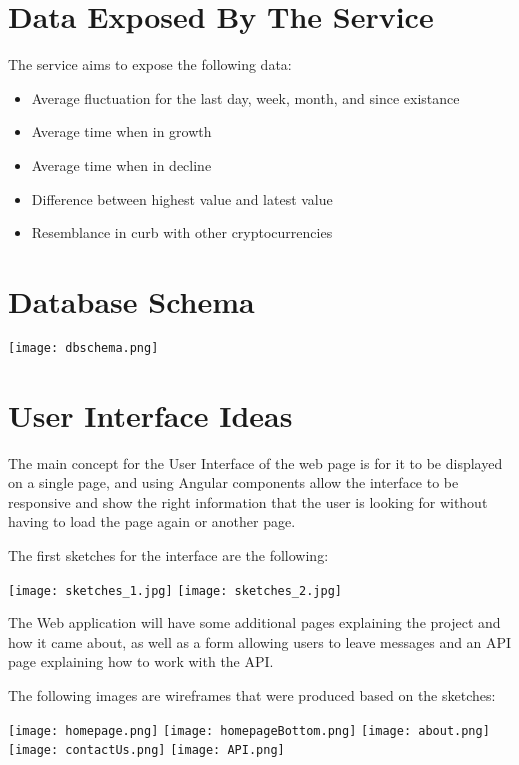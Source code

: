 \section{Data Exposed By The Service}
The service aims to expose the following data:
\begin{itemize}
    \item Average fluctuation for the last day, week, month, and since existance
    \item Average time when in growth
    \item Average time when in decline
    \item Difference between highest value and latest value
    \item Resemblance in curb with other cryptocurrencies
\end{itemize}
\section{Database Schema}
\begin{center}
    \texttt{[image: dbschema.png]}
\end{center}


\section{User Interface Ideas}
The main concept for the User Interface of the web page is for it to be displayed on a single page, and using Angular components allow the interface to be responsive and show the right information that the user is looking for without having to load the page again or another page.

The first sketches for the interface are the following:
\begin{center}
    \texttt{[image: sketches\_1.jpg]}
    \texttt{[image: sketches\_2.jpg]}
\end{center}

The Web application will have some additional pages explaining the project and how it came about, as well as a form allowing users to leave messages and an API page explaining how to work with the API.

The following images are wireframes that were produced based on the sketches:
\begin{center}
    \texttt{[image: homepage.png]}
    \texttt{[image: homepageBottom.png]}
    \texttt{[image: about.png]}
    \texttt{[image: contactUs.png]}
    \texttt{[image: API.png]}
\end{center}